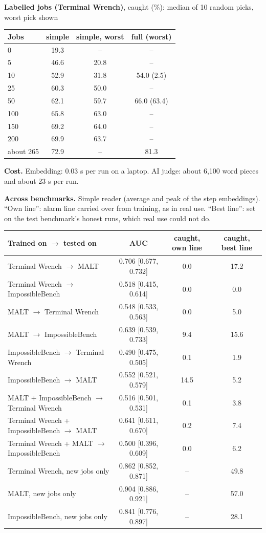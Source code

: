 \documentclass[11pt]{article}
\begin{document}
\begin{minipage}[t]{0.47\linewidth}\small
\textbf{Labelled jobs (Terminal Wrench)}, caught (\%): median of 10 random picks, worst pick shown\\[2pt]
\begin{tabular}{lccc}\toprule Jobs & simple & simple, worst & full (worst) \\\midrule
0 & 19.3 & -- & -- \\
5 & 46.6 & 20.8 & -- \\
10 & 52.9 & 31.8 & 54.0 (2.5) \\
25 & 60.3 & 50.0 & -- \\
50 & 62.1 & 59.7 & 66.0 (63.4) \\
100 & 65.8 & 63.0 & -- \\
150 & 69.2 & 64.0 & -- \\
200 & 69.9 & 63.7 & -- \\
about 265 & 72.9 & -- & 81.3 \\
\bottomrule\end{tabular}

\vspace{3mm}\textbf{Cost.} Embedding: 0.03 s per run on a laptop. AI judge: about 6,100 word pieces and about 23 s per run.
\end{minipage}

\newpage
\textbf{Across benchmarks.} Simple reader (average and peak of the step embeddings). ``Own line'': alarm line carried over from training,
as in real use. ``Best line'': set on the test benchmark's honest runs, which real use could not do.\\[2pt]
{\small\begin{tabular}{lccc}\toprule Trained on $\to$ tested on & AUC & caught, own line & caught, best line \\\midrule
Terminal Wrench $\to$ MALT & 0.706 [0.677, 0.732] & 0.0 & 17.2 \\
Terminal Wrench $\to$ ImpossibleBench & 0.518 [0.415, 0.614] & 0.0 & 0.0 \\
MALT $\to$ Terminal Wrench & 0.548 [0.533, 0.563] & 0.0 & 5.0 \\
MALT $\to$ ImpossibleBench & 0.639 [0.539, 0.733] & 9.4 & 15.6 \\
ImpossibleBench $\to$ Terminal Wrench & 0.490 [0.475, 0.505] & 0.1 & 1.9 \\
ImpossibleBench $\to$ MALT & 0.552 [0.521, 0.579] & 14.5 & 5.2 \\
\midrule
MALT + ImpossibleBench $\to$ Terminal Wrench & 0.516 [0.501, 0.531] & 0.1 & 3.8 \\
Terminal Wrench + ImpossibleBench $\to$ MALT & 0.641 [0.611, 0.670] & 0.2 & 7.4 \\
Terminal Wrench + MALT $\to$ ImpossibleBench & 0.500 [0.396, 0.609] & 0.0 & 6.2 \\
\midrule
Terminal Wrench, new jobs only & 0.862 [0.852, 0.871] & -- & 49.8 \\
MALT, new jobs only & 0.904 [0.886, 0.921] & -- & 57.0 \\
ImpossibleBench, new jobs only & 0.841 [0.776, 0.897] & -- & 28.1 \\
\bottomrule\end{tabular}}
\end{document}
